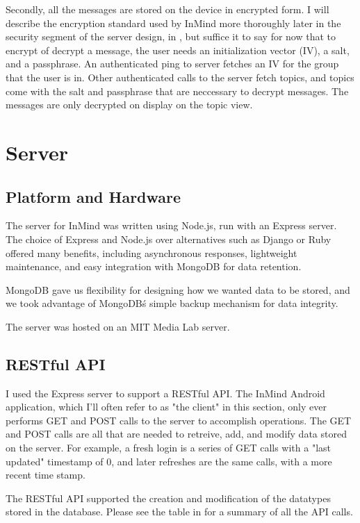       Secondly, all the messages are stored on the device in encrypted form.
      I will describe the encryption standard used by InMind more thoroughly
      later in the security segment of the server design, in \cite{},
      but suffice it to say for now that to encrypt of decrypt a message, 
      the user needs an initialization vector (IV),
      a salt, and a passphrase.
      An authenticated ping to server fetches an IV for the group that the user is in.
      Other authenticated calls to the server fetch topics,
      and topics come with the salt and passphrase that are neccessary to decrypt messages.
      The messages are only decrypted on display on the topic view.

  \section{Server}
    \subsection{Platform and Hardware}
      The server for InMind was written using Node.js, run with an Express server.
      The choice of Express and Node.js over alternatives such as Django or Ruby
      offered many benefits, including asynchronous responses,
      lightweight maintenance, and easy integration with MongoDB for data retention.

      MongoDB gave us flexibility for designing how we wanted data to be stored,
      and we took advantage of MongoDB\'s simple backup mechanism for data integrity.

      The server was hosted on an MIT Media Lab server.

    \subsection{RESTful API}
      I used the Express server to support a RESTful API.
      The InMind Android application,
      which I'll often refer to as "the client" in this section,
      only ever performs GET and POST calls to the server to accomplish operations.
      The GET and POST calls are all that are needed to
      retreive, add, and modify data stored on the server.
      For example, a fresh login is a series of GET calls with a "last updated" timestamp
      of 0, and later refreshes are the same calls, with a more recent time stamp.

      The RESTful API supported the creation and modification of the datatypes
      stored in the database.
      Please see the table in \cite{} for a summary of all the API calls.

